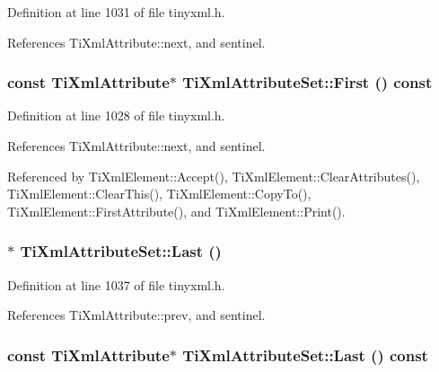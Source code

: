 Definition at line 1031 of file tinyxml.h.

References TiXmlAttribute::next, and sentinel.\hypertarget{class_ti_xml_attribute_set_ae0636e88cedd4b09d61c451860f68598}{
\subsubsection[{First}]{\setlength{\rightskip}{0pt plus 5cm}const {\bf TiXmlAttribute}$\ast$ TiXmlAttributeSet::First () const}}
\label{class_ti_xml_attribute_set_ae0636e88cedd4b09d61c451860f68598}


Definition at line 1028 of file tinyxml.h.

References TiXmlAttribute::next, and sentinel.

Referenced by TiXmlElement::Accept(), TiXmlElement::ClearAttributes(), TiXmlElement::ClearThis(), TiXmlElement::CopyTo(), TiXmlElement::FirstAttribute(), and TiXmlElement::Print().\hypertarget{class_ti_xml_attribute_set_ab4c4edfb2d74f6ea31aae096743bd6e0}{
\subsubsection[{Last}]{$\ast$ TiXmlAttributeSet::Last ()}}
\label{class_ti_xml_attribute_set_ab4c4edfb2d74f6ea31aae096743bd6e0}


Definition at line 1037 of file tinyxml.h.

References TiXmlAttribute::prev, and sentinel.\hypertarget{class_ti_xml_attribute_set_a7b3f3ccf39a97bc25539d3fcc540296a}{
\subsubsection[{Last}]{\setlength{\rightskip}{0pt plus 5cm}const {\bf TiXmlAttribute}$\ast$ TiXmlAttributeSet::Last () const}}
\label{class_ti_xml_attribute_set_a7b3f3ccf39a97bc25539d3fcc540296a}


